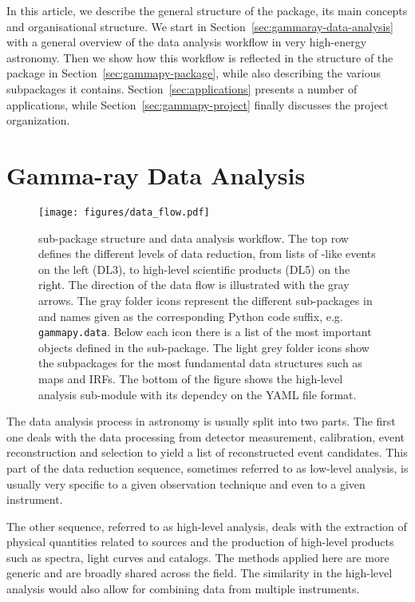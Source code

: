 \documentclass[longauth]{aa}
\newcommand{\code}[1]{\texttt{#1}}
\begin{document}
In this article, we describe the general structure of the \gammapy package,
its main concepts and organisational structure. We start in
Section~\ref{sec:gammaray-data-analysis} with a general overview
of the data analysis workflow in very high-energy \gammaray astronomy. Then we
show how this workflow is reflected in the structure of the \gammapy package 
in Section~\ref{sec:gammapy-package}, while also
describing the various subpackages it contains. Section~\ref{sec:applications}
presents a number of applications, while Section~\ref{sec:gammapy-project}
finally discusses the project organization.


\section{Gamma-ray Data Analysis}
\begin{figure*}[t]
	\centering
	\texttt{[image: figures/data\_flow.pdf]}
	\caption{
		\gammapy sub-package structure and data analysis workflow. The top row
        defines the different levels of data reduction, from lists of \gammaray-like
        events on the left (DL3), to high-level scientific products
        (DL5) on the right. The direction of the data flow is illustrated with the
        gray arrows. The gray folder icons represent the different sub-packages
        in \gammapy and names given as the corresponding Python code suffix, e.g. 
		\code{gammapy.data}. Below each icon there is a list of the most
        important objects defined in the sub-package. The light grey folder
		icons show the subpackages for the most fundamental data structures such 
		as maps and IRFs. The bottom of the figure shows the high-level analysis
		sub-module with its dependcy on the YAML file format. 
    }
	\label{fig:data_flow}
\end{figure*}
%
\label{sec:gammaray-data-analysis}
The data analysis process in \gammaray astronomy is usually split into two parts.
The first one deals with the data processing from detector measurement, calibration, event
reconstruction and selection to yield a list of reconstructed \gammaray event candidates.
This part of the data reduction sequence, sometimes referred to as low-level analysis,
is usually very specific to a given observation technique and even to a given instrument.

The other sequence, referred to as high-level analysis, deals with the extraction of physical
quantities related to \gammaray sources and the production of high-level products such as spectra,
light curves and catalogs. The methods applied here are more generic and are broadly
shared across the field. The similarity in the high-level analysis would also allow
for combining data from multiple instruments.
\end{document}
